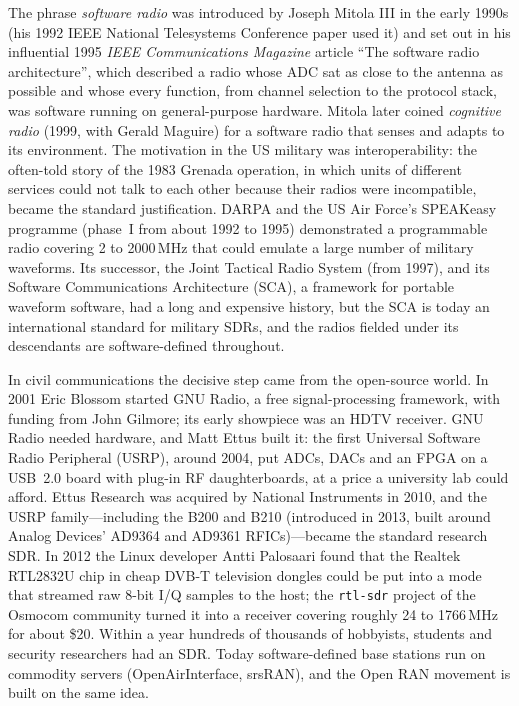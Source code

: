
\begin{history}
The phrase \emph{software radio} was introduced by Joseph Mitola III in the early 1990s (his 1992 IEEE
National Telesystems Conference paper used it) and set out in his influential 1995 \emph{IEEE
Communications Magazine} article ``The software radio architecture'', which described a radio whose ADC
sat as close to the antenna as possible and whose every function, from channel selection to the
protocol stack, was software running on general-purpose hardware. Mitola later coined \emph{cognitive
radio} (1999, with Gerald Maguire) for a software radio that senses and adapts to its environment. The
motivation in the US military was interoperability: the often-told story of the 1983 Grenada operation,
in which units of different services could not talk to each other because their radios were
incompatible, became the standard justification. DARPA and the US Air Force's SPEAKeasy programme
(phase~I from about 1992 to 1995) demonstrated a programmable radio covering 2 to 2000\,MHz that could
emulate a large number of military waveforms. Its successor, the Joint Tactical Radio System (from
1997), and its Software Communications Architecture (SCA), a framework for portable waveform software,
had a long and expensive history, but the SCA is today an international standard for military SDRs, and
the radios fielded under its descendants are software-defined throughout.
\end{history}

\begin{history}
In civil communications the decisive step came from the open-source world. In 2001 Eric Blossom
started GNU Radio, a free signal-processing framework, with funding from John Gilmore; its early
showpiece was an HDTV receiver. GNU Radio needed hardware, and Matt Ettus built it: the first Universal
Software Radio Peripheral (USRP), around 2004, put ADCs, DACs and an FPGA on a USB~2.0 board with
plug-in RF daughterboards, at a price a university lab could afford. Ettus Research was acquired by
National Instruments in 2010, and the USRP family---including the B200 and B210 (introduced in 2013,
built around Analog Devices' AD9364 and AD9361 RFICs)---became the standard research SDR. In 2012 the
Linux developer Antti Palosaari found that the Realtek RTL2832U chip in cheap DVB-T television dongles
could be put into a mode that streamed raw 8-bit I/Q samples to the host; the \texttt{rtl-sdr} project of
the Osmocom community turned it into a receiver covering roughly 24 to 1766\,MHz for about \$20. Within a
year hundreds of thousands of hobbyists, students and security researchers had an SDR. Today
software-defined base stations run on commodity servers (OpenAirInterface, srsRAN), and the Open RAN
movement is built on the same idea.
\end{history}


